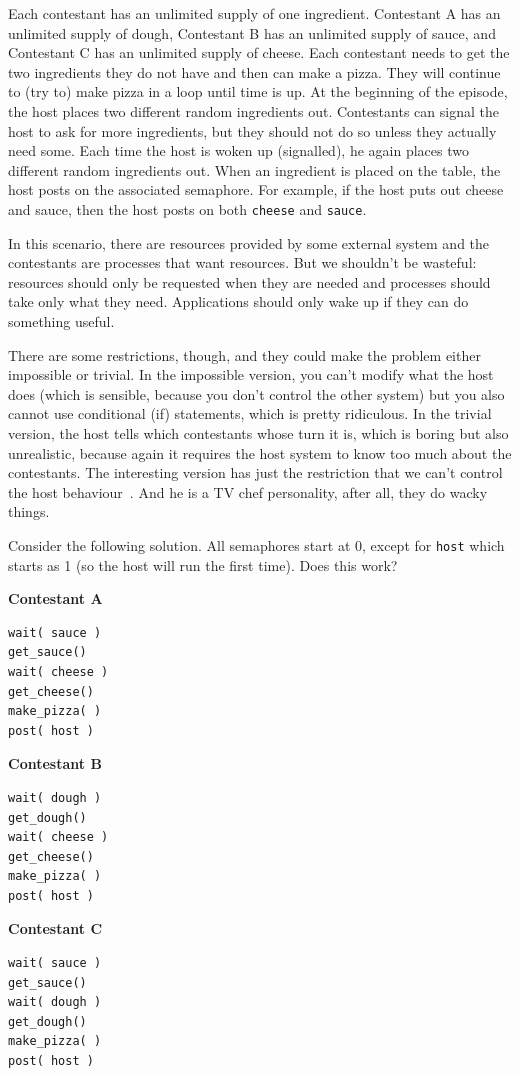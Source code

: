 \documentclass[a4paper]{report}
\begin{document}
Each contestant has an unlimited supply of one ingredient. Contestant A has an unlimited supply of dough, Contestant B has an unlimited supply of sauce, and Contestant C has an unlimited supply of cheese. Each contestant needs to get the two ingredients they do not have and then can make a pizza. They will continue to (try to) make pizza in a loop until time is up. At the beginning of the episode, the host places two different random ingredients out. Contestants can signal the host to ask for more ingredients, but they should not do so unless they actually need some. Each time the host is woken up (signalled), he again places two different random ingredients out. When an ingredient is placed on the table, the host posts on the associated semaphore. For example, if the host puts out cheese and sauce, then the host posts on both \texttt{cheese} and \texttt{sauce}.

In this scenario, there are resources provided by some external system and the contestants are processes that want resources. But we shouldn't be wasteful: resources should only be requested when they are needed and processes should take only what they need. Applications should only wake up if they can do something useful.

There are some restrictions, though, and they could make the problem either impossible or trivial. In the impossible version, you can't modify what the host does (which is sensible, because you don't control the other system) but you also cannot use conditional (if) statements, which is pretty ridiculous. In the trivial version, the host tells which contestants whose turn it is, which is boring but also unrealistic, because again it requires the host system to know too much about the contestants. The interesting version has just the restriction that we can't control the host behaviour~\cite{lbs}. And he is a TV chef personality, after all, they do wacky things.

Consider the following solution. All semaphores start at 0, except for \texttt{host} which starts as 1 (so the host will run the first time). Does this work?

\begin{multicols}{3}
	\textbf{Contestant A}
	\begin{lstlisting}
wait( sauce )
get_sauce()
wait( cheese )
get_cheese()
make_pizza( )
post( host )
\end{lstlisting}
	\columnbreak
	\textbf{Contestant B}
	\begin{lstlisting}
wait( dough )
get_dough()
wait( cheese )
get_cheese()
make_pizza( )
post( host )
\end{lstlisting}
	\columnbreak
	\textbf{Contestant C}
	\begin{lstlisting}
wait( sauce )
get_sauce()
wait( dough )
get_dough()
make_pizza( )
post( host )
\end{lstlisting}
\end{multicols}
\end{document}
